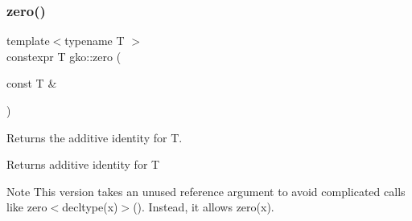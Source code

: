 \mbox{\label{namespacegko_a9f1cd7be946b9a2c15b01b744cf3e732}} 
\subsubsection{\texorpdfstring{zero()}{zero()}\hspace{0.1cm}{\footnotesize\ttfamily [2/2]}}
{\footnotesize\ttfamily template$<$typename T $>$ \\
constexpr T gko\+::zero (\begin{DoxyParamCaption}\item[{const T \&}]{ }\end{DoxyParamCaption})\hspace{0.3cm}{\ttfamily [inline]}}



Returns the additive identity for T. 

\begin{DoxyReturn}{Returns}
additive identity for T
\end{DoxyReturn}
\begin{DoxyNote}{Note}
This version takes an unused reference argument to avoid complicated calls like {\ttfamily zero$<$decltype(x)$>$()}. Instead, it allows {\ttfamily zero(x)}. 
\end{DoxyNote}
